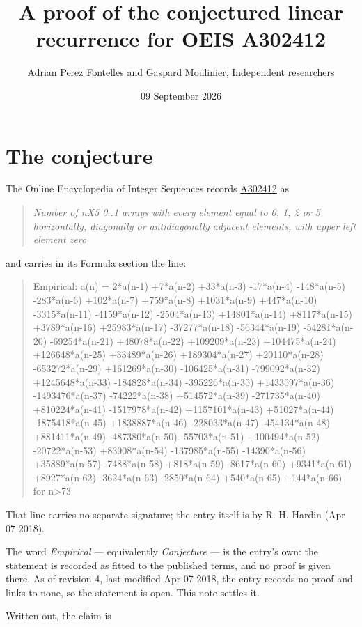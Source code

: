 \documentclass[11pt]{article}
\title{A proof of the conjectured linear recurrence for OEIS A302412}
\author{Adrian Perez Fontelles and Gaspard Moulinier, Independent researchers}
\date{09 September 2026}
\theoremstyle{definition}
\begin{document}
\maketitle
\section{The conjecture}

The Online Encyclopedia of Integer Sequences records \href{https://oeis.org/A302412}{A302412} as

\begin{quote}\itshape Number of nX5 0..1 arrays with every element equal to 0, 1, 2 or 5 horizontally, diagonally or antidiagonally adjacent elements, with upper left element zero\end{quote}

and carries in its Formula section the line:

\begin{quote}\ttfamily Empirical: a(n) = 2*a(n-1) +7*a(n-2) +33*a(n-3) -17*a(n-4) -148*a(n-5) -283*a(n-6) +102*a(n-7) +759*a(n-8) +1031*a(n-9) +447*a(n-10) -3315*a(n-11) -4159*a(n-12) -2504*a(n-13) +14801*a(n-14) +8117*a(n-15) +3789*a(n-16) +25983*a(n-17) -37277*a(n-18) -56344*a(n-19) -54281*a(n-20) -69254*a(n-21) +48078*a(n-22) +109209*a(n-23) +104475*a(n-24) +126648*a(n-25) +33489*a(n-26) +189304*a(n-27) +20110*a(n-28) -653272*a(n-29) +161269*a(n-30) -106425*a(n-31) -799092*a(n-32) +1245648*a(n-33) -184828*a(n-34) -395226*a(n-35) +1433597*a(n-36) -1493476*a(n-37) -74222*a(n-38) +514572*a(n-39) -271735*a(n-40) +810224*a(n-41) -1517978*a(n-42) +1157101*a(n-43) +51027*a(n-44) -1875418*a(n-45) +1838887*a(n-46) -228033*a(n-47) -454134*a(n-48) +881411*a(n-49) -487380*a(n-50) -55703*a(n-51) +100494*a(n-52) -20722*a(n-53) +83908*a(n-54) -137985*a(n-55) -14390*a(n-56) +35889*a(n-57) -7488*a(n-58) +818*a(n-59) -8617*a(n-60) +9341*a(n-61) +8927*a(n-62) -3624*a(n-63) -2850*a(n-64) +540*a(n-65) +144*a(n-66) for n>73\end{quote}

That line carries no separate signature; the entry itself is by R. H. Hardin (Apr 07 2018).

The word {\itshape Empirical} --- equivalently {\itshape Conjecture} --- is the entry's own: the statement is recorded as fitted to the published terms, and no proof is given there. As of revision 4, last modified Apr 07 2018, the entry records no proof and links to none, so the statement is open. This note settles it.

Written out, the claim is
\end{document}
